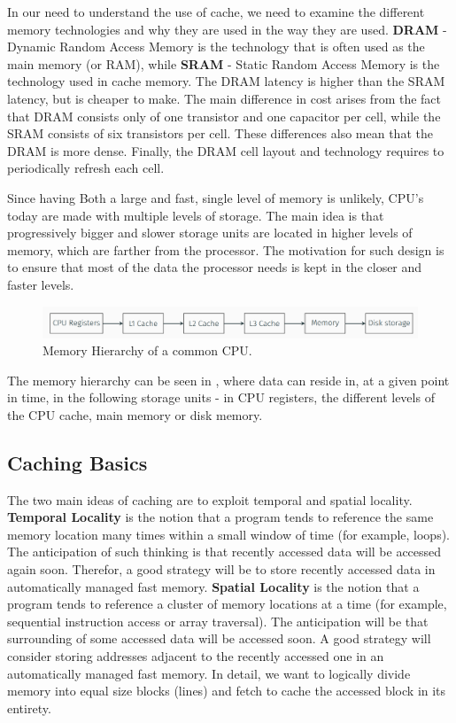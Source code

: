 In our need to understand the use of cache, we need to examine the different
memory technologies and why they are used in the way they are used. \textbf{DRAM} -
Dynamic Random Access Memory is the technology that is often used as the main
memory (or RAM), while \textbf{SRAM} - Static Random Access Memory is the
technology used in cache memory. The DRAM latency is higher than the SRAM latency, but
is cheaper to make. The main difference in cost arises from the fact that DRAM
consists only of one transistor and one capacitor per cell, while the SRAM
consists of six transistors per cell. These differences also mean that the DRAM is more
dense. Finally, the DRAM cell layout and technology requires to periodically
refresh each cell.

Since having Both a large and fast, single level of memory is unlikely, CPU's
today are made with multiple levels of storage. The main idea is that
progressively bigger and slower storage units are located in higher levels of
memory, which are farther from the processor. The motivation for such design is
to ensure that most of the data the processor needs is kept in the closer and
faster levels.

\begin{figure}
    \centering
    \includegraphics[width=\textwidth]{images/chapter_6/MemHier.PNG}
    \caption{Memory Hierarchy of a common CPU.}
    \label{fig:MemHier}
\end{figure}

The memory hierarchy can be seen in , where data can reside
in, at a given point in time, in the following storage units - in CPU registers,
the different levels of the CPU cache, main memory or disk memory. 

\subsection{Caching Basics}
\label{subsec:cachingbasics}
The two main ideas of caching are to exploit temporal and spatial locality.
\textbf{Temporal Locality} is the notion that a program tends to reference the
same memory location many times within a small window of time (for example,
loops). The anticipation of such thinking is that recently accessed data will be
accessed again soon. Therefor, a good strategy will be to store recently
accessed data in automatically managed fast memory. \textbf{Spatial Locality} is
the notion that a program tends to reference a cluster of memory locations at a
time (for example, sequential instruction access or array traversal). The
anticipation will be that surrounding of some accessed data will be accessed
soon. A good strategy will consider storing addresses adjacent to the recently
accessed one in an automatically managed fast memory. In detail, we want to
logically divide memory into equal size blocks (lines) and fetch to cache the
accessed block in its entirety.   

